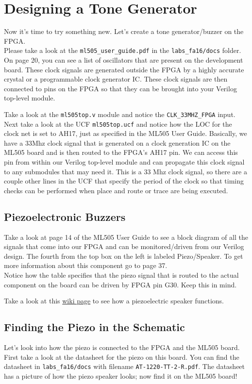 \documentclass[11pt]{article}
\begin{document}
\section{Designing a Tone Generator}
Now it's time to try something new. Let's create a tone generator/buzzer on the FPGA. \\

Please take a look at the \verb|ml505_user_guide.pdf| in the \verb|labs_fa16/docs| folder. On page 20, you can see a list of oscillators that are present on the development board. These clock signals are generated outside the FPGA by a highly accurate crystal or a programmable clock generator IC. These clock signals are then connected to pins on the FPGA so that they can be brought into your Verilog top-level module.

Take a look at the \verb|ml505top.v| module and notice the \verb|CLK_33MHZ_FPGA| input. Next take a look at the UCF \verb|ml505top.ucf| and notice how the LOC for the clock net is set to AH17, just as specified in the ML505 User Guide. Basically, we have a 33Mhz clock signal that is generated on a clock generation IC on the ML505 board and is then routed to the FPGA's AH17 pin. We can access this pin from within our Verilog top-level module and can propagate this clock signal to any submodules that may need it. This is a 33 Mhz clock signal, so there are a couple other lines in the UCF that specify the period of the clock so that timing checks can be performed when place and route or trace are being executed.

\subsection{Piezoelectronic Buzzers}
Take a look at page 14 of the ML505 User Guide to see a block diagram of all the signals that come into our FPGA and can be monitored/driven from our Verilog design. The fourth from the top box on the left is labeled Piezo/Speaker. To get more information about this component go to page 37.\\

Notice how the table specifies that the piezo signal that is routed to the actual component on the board can be driven by FPGA pin G30. Keep this in mind.

Take a look at this \href{https://en.wikipedia.org/wiki/Piezoelectric_speaker}{wiki page} to see how a piezoelectric speaker functions.

\subsection{Finding the Piezo in the Schematic}
Let's look into how the piezo is connected to the FPGA and the ML505 board. First take a look at the datasheet for the piezo on this board. You can find the datasheet in \verb|labs_fa16/docs| with filename \verb|AT-1220-TT-2-R.pdf|. The datasheet has a picture of how the piezo speaker looks; now find it on the ML505 board! \\
\end{document}
